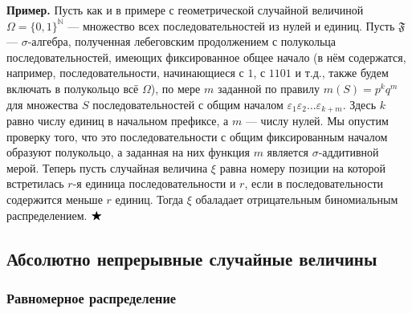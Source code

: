 \documentclass[12pt]{article}
\numberwithin{theorem}{section}
\theoremstyle{definition}
\newenvironment{example}{\indent \textbf{Пример.}}{$ \hfill \bigstar $}
\newcommand{\events}{\mathfrak{F}}
\begin{document}
	\begin{example}
		Пусть как и в примере с геометрической случайной величиной 
		$ \Omega = \{0,1\}^{\mathbb{N}} $ --- множество всех последовательностей из нулей и единиц.
		Пусть $ \events $ --- $ \sigma $-алгебра, полученная лебеговским продолжением с полукольца последовательностей,
		имеющих фиксированное общее начало 
		(в нём содержатся, например, последовательности, начинающиеся с $ 1 $, с $ 1101 $ и т.д., 
		также будем включать в полукольцо всё $ \Omega $), 
		по мере $ m $ заданной по правилу $ m(S) = p^kq^m $ для множества $ S $ последовательностей с общим началом
		$ \varepsilon_1\varepsilon_2\ldots\varepsilon_{k + m} $. Здесь $ k $ равно числу единиц в начальном префиксе, 
		а $ m $ --- числу нулей. 
		Мы опустим проверку того, что это последовательности с общим фиксированным началом образуют полукольцо,
		а заданная на них функция $ m $ является $ \sigma $-аддитивной мерой.
		Теперь пусть случайная величина $ \xi $ равна номеру позиции на которой встретилась $ r $-я единица последовательности
		и $ r $, если в последовательности содержится меньше $ r $ единиц.
		Тогда $ \xi $ обаладает отрицательным биномиальным распределением.
	\end{example}
	
	\subsection{Абсолютно непрерывные случайные величины}
	
	\subsubsection{Равномерное распределение}
	
\end{document}
